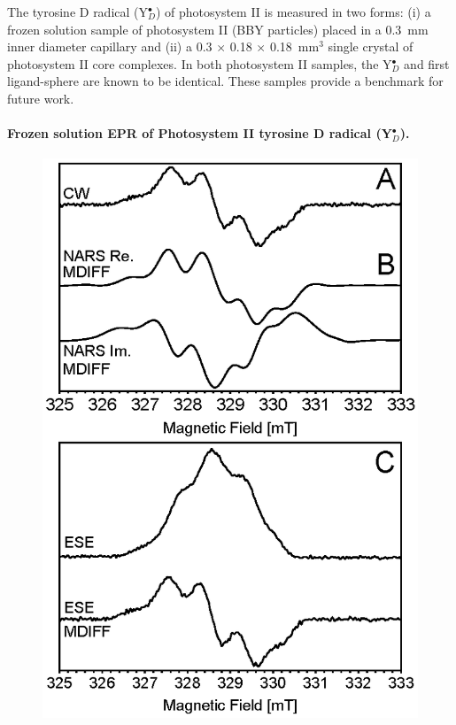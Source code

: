 The tyrosine D radical (Y$_D^\bullet$) of photosystem II is measured in two forms: (i) a frozen solution sample of photosystem II (BBY particles) \cite{BBY1981} placed in a 0.3~mm inner diameter capillary and (ii) a 0.3 $\times$ 0.18 $\times$ 0.18~mm$^3$ single crystal of photosystem II core complexes. \cite{KERN2005147} In both photosystem II samples, the Y$_D^\bullet$ and first ligand-sphere are known to be identical. These samples provide a benchmark for future work.

\paragraph{Frozen solution EPR of Photosystem II tyrosine D radical (Y$_D^\bullet$).}
\begin{figure}[htbp]
\centering
\includegraphics{Kapitel/Ch4-Images/02-PSII-BBY-Data.eps}

\end{figure}
